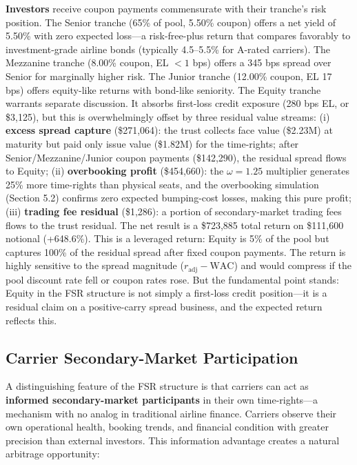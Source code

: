 \documentclass[12pt,a4paper]{article}
\begin{document}
\textbf{Investors} receive coupon payments commensurate with their tranche's risk position. The Senior tranche (65\% of pool, 5.50\% coupon) offers a net yield of 5.50\% with zero expected loss---a risk-free-plus return that compares favorably to investment-grade airline bonds (typically 4.5--5.5\% for A-rated carriers). The Mezzanine tranche (8.00\% coupon, EL $< 1$ bps) offers a 345 bps spread over Senior for marginally higher risk. The Junior tranche (12.00\% coupon, EL 17 bps) offers equity-like returns with bond-like seniority. The Equity tranche warrants separate discussion. It absorbs first-loss credit exposure (280 bps EL, or \$3,125), but this is overwhelmingly offset by three residual value streams: (i) \textbf{excess spread capture} (\$271,064): the trust collects face value (\$2.23M) at maturity but paid only issue value (\$1.82M) for the time-rights; after Senior/Mezzanine/Junior coupon payments (\$142,290), the residual spread flows to Equity; (ii) \textbf{overbooking profit} (\$454,660): the $\omega = 1.25$ multiplier generates 25\% more time-rights than physical seats, and the overbooking simulation (Section 5.2) confirms zero expected bumping-cost losses, making this pure profit; (iii) \textbf{trading fee residual} (\$1,286): a portion of secondary-market trading fees flows to the trust residual. The net result is a \$723,885 total return on \$111,600 notional (+648.6\%). This is a leveraged return: Equity is 5\% of the pool but captures 100\% of the residual spread after fixed coupon payments. The return is highly sensitive to the spread magnitude ($r_{\text{adj}} - \text{WAC}$) and would compress if the pool discount rate fell or coupon rates rose. But the fundamental point stands: Equity in the FSR structure is not simply a first-loss credit position---it is a residual claim on a positive-carry spread business, and the expected return reflects this.

\subsection{Carrier Secondary-Market Participation}

A distinguishing feature of the FSR structure is that carriers can act as \textbf{informed secondary-market participants} in their own time-rights---a mechanism with no analog in traditional airline finance. Carriers observe their own operational health, booking trends, and financial condition with greater precision than external investors. This information advantage creates a natural arbitrage opportunity:
\end{document}
